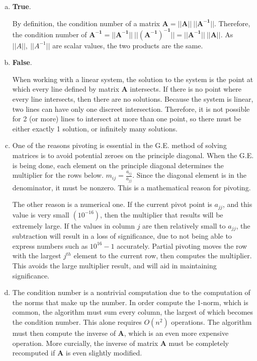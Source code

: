 \documentclass[11pt]{article}
\begin{document}
\begin{enumerate}
\begin{enumerate}[(a)]
		\item \textbf{True}.

		By definition, the condition number of a matrix $\mathbf{A = ||A||\ ||A^{-1}||}$. Therefore, the condition number of
		$\mathbf{A^{-1} = ||A^{-1}||\ ||(A^{-1})^{-1}|| = ||A^{-1}||\ ||A||}$. As $||A||,\ ||A^{-1}||$ are scalar values, the two products are the same.

		\item \textbf{False}.

		When working with a linear system, the solution to the system is the point at which every line defined by matrix $\mathbf{A}$ intersects. If there is no
		point where every line intersects, then there are no solutions. Because the system is
		linear, two lines can have only one discreet intersection. Therefore, it is not possible for 2 (or more) lines to intersect at more than one point, so there
		must be either exactly 1 solution, or infinitely many solutions. \\

		\item One of the reasons pivoting is essential in the G.E. method of solving matrices is to avoid potential zeroes on the principle
		diagonal. When the G.E. is being done, each element on the principle diagonal determines the multiplier for the rows below. $m_{ij}
		= \frac{a_{ij}}{a_{jj}}$. Since the diagonal element is in the denominator, it must be nonzero. This is a mathematical reason for
		pivoting.

		The other reason is a numerical one. If the current pivot point is $a_{jj}$, and this value is very small $(10^{-16})$, then the
		multiplier that results will be extremely large. If the values in column $j$ are then relatively small to $a_{jj}$, the subtraction
		will result in a loss of significance, due to not being able to express numbers such as $10^{16}-1$ accurately. Partial pivoting moves
		the row with the largest $j^{th}$ element to the current row, then computes the multiplier. This avoids the large multiplier result,
		and will aid in maintaining significance. \\

		\item The condition number is a nontrivial computation due to the computation of the norms that make up the number. In order
		compute the 1-norm, which is common, the algorithm must sum every column, the largest of which becomes the condition number.
		This alone requires $O(n^2)$ operations. The algorithm must then compute the inverse of $\mathbf{A}$, which is an even more
		expensive operation. More curcially, the inverse of matrix $\mathbf{A}$ must be completely recomputed if $\mathbf{A}$ is even
		slightly modified. \\


\end{enumerate}
\end{enumerate}
\end{document}
